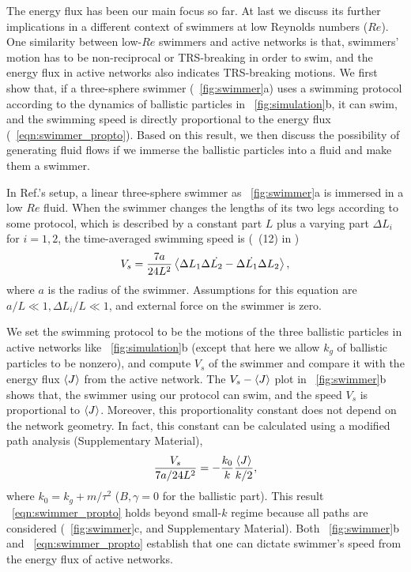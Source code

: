 \documentclass[
 preprint,
 preprintnumbers,
 amsmath,amssymb,
 aps,
 pre,
 longbibliography,
 10pt, twocolumn
]{revtex4-1}
\begin{document}
The energy flux has been our main focus so far. At last we discuss its further implications in a different context of swimmers at low Reynolds numbers ($Re$).
One similarity between low-$Re$ swimmers and active networks is that, swimmers' motion has to be non-reciprocal or TRS-breaking in order to swim, and the energy flux in active networks also indicates TRS-breaking motions.
We first show that, if a three-sphere swimmer \cite{Golestanian2008AnalyticNumber} (\figurename~\ref{fig:swimmer}a) uses a swimming protocol according to the dynamics of ballistic particles in \figurename~\ref{fig:simulation}b, it can swim, and the swimming speed is directly proportional to the energy flux (\eqnname~\eqref{eqn:swimmer_propto}).
Based on this result, we then discuss the possibility of generating fluid flows if we immerse the ballistic particles into a fluid and make them a swimmer.

In Ref.\cite{Golestanian2008AnalyticNumber}'s setup, a linear three-sphere swimmer as \figurename~\ref{fig:swimmer}a is immersed in a low $Re$ fluid. When the swimmer changes the lengths of its two legs according to some protocol, which is described by a constant part $L$ plus a varying part $\Delta L_i$ for $i=1,2$, the time-averaged swimming speed is (\eqnname~(12) in \cite{Golestanian2008AnalyticNumber})
\begin{equation} \label{eqn:swimmer_speed}
    V_s = \frac{7a}{24L^2} \expval{\Delta L_1 \Delta \Dot{L_2} - \Delta \Dot{L_1} \Delta{L_2}},
\end{equation}
where $a$ is the radius of the swimmer. Assumptions for this equation are $a/L \ll 1, \Delta L_i/L \ll 1$, and external force on the swimmer is zero.

We set the swimming protocol to be the motions of the three ballistic particles in active networks like \figurename~\ref{fig:simulation}b (except that here we allow $k_g$ of ballistic particles to be nonzero),
and compute $V_s$ of the swimmer and compare it with the energy flux $\expval{J}$ from the active network. 
The $V_s-\expval{J}$ plot in \figurename~\ref{fig:swimmer}b shows that, the swimmer using our protocol can swim, and the speed $V_s$ is proportional to $\expval{J}$. Moreover, this proportionality constant does not depend on the network geometry. 
In fact, this constant can be calculated using a modified path analysis (Supplementary Material), 
\begin{equation} \label{eqn:swimmer_propto}
    \frac{V_s}{7a/24L^2} = -\frac{k_0}{k} \frac{\expval{J}}{k/2},
\end{equation}
where $k_0 = k_g + m/\tau^2$ ($B,\gamma=0$ for the ballistic part).
This result \eqnname~\eqref{eqn:swimmer_propto} holds beyond small-$k$ regime because all paths are considered (\figurename~\ref{fig:swimmer}c, and Supplementary Material).
Both \figurename~\ref{fig:swimmer}b and \eqnname~\eqref{eqn:swimmer_propto}  establish that one can dictate swimmer's speed from the energy flux of active networks.
\end{document}
